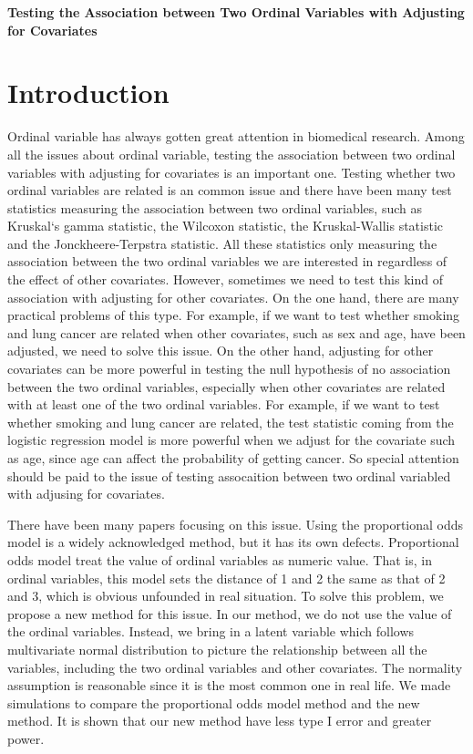 \documentclass[a4,11pt,epsf, amssymb]{article}
\begin{document}
\begin{CJK}{GBK}{song}
\begin{center}
{\bf\huge Testing the Association between Two Ordinal Variables with Adjusting for Covariates}
\end{center}

\section{Introduction}
Ordinal variable has always gotten great attention in biomedical research. Among all the issues about ordinal variable, testing the association between two ordinal variables with adjusting for covariates is an important one. Testing whether two ordinal variables are related is an common issue and there have been many test statistics measuring the association between two ordinal variables, such as Kruskal`s gamma statistic, the Wilcoxon statistic, the Kruskal-Wallis statistic and the Jonckheere-Terpstra statistic. All these statistics only measuring the association between the two ordinal variables we are interested in regardless of the effect of other covariates. However, sometimes we need to test this kind of association with adjusting for other covariates. On the one hand, there are many practical problems of this type. For example, if we want to test whether smoking and lung cancer are related when other covariates, such as sex and age, have been adjusted, we need to solve this issue. On the other hand, adjusting for other covariates can be more powerful in testing the null hypothesis of no association between the two ordinal variables, especially when other covariates are related with at least one of the two ordinal variables. For example, if we want to test whether smoking and lung cancer are related, the test statistic coming from the logistic regression model is more powerful when we adjust for the covariate such as age, since age can affect the probability of getting cancer. So special attention should be paid to the issue of testing assocaition between two ordinal variabled with adjusing for covariates.

There have been many papers focusing on this issue. Using the proportional odds model is a widely acknowledged method, but it has its own defects. Proportional odds model treat the value of ordinal variables as numeric value. That is, in ordinal variables, this model sets the distance of 1 and 2 the same as that of 2 and 3, which is obvious unfounded in real situation. To solve this problem, we propose a new method for this issue. In our method, we do not use the value of the ordinal variables. Instead, we bring in a latent variable which follows multivariate normal distribution to picture the relationship between all the variables, including the two ordinal variables and other covariates. The normality assumption is reasonable since it is the most common one in real life. We made simulations to compare the proportional odds model method and the new method. It is shown that our new method have less type I error and greater power.


\end{CJK}
\end{document}
